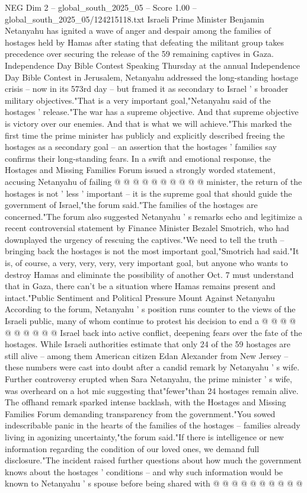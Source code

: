 \begin{textsample}{NEG Dim 2 – global\_south\_2025\_05 – Score 1.00 – global\_south\_2025\_05/124215118.txt}  \label{ex:f2_neg_145}
Israeli Prime Minister Benjamin Netanyahu has ignited a wave of anger and despair among the families of hostages held by Hamas after stating that defeating the militant group takes precedence over securing the release of the 59 remaining captives in Gaza.
Independence Day Bible Contest Speaking Thursday at the annual Independence Day Bible Contest in Jerusalem, Netanyahu addressed the long-standing hostage crisis -- now in its 573rd day -- but framed it as secondary to Israel ' s broader military objectives."That is a very important goal,"Netanyahu said of the hostages ' release."The war has a supreme objective.
And that supreme objective is victory over our enemies.
And that is what we will achieve."This marked the first time the prime minister has publicly and explicitly described freeing the hostages as a secondary goal -- an assertion that the hostages ' families say confirms their long-standing fears.
In a swift and emotional response, the Hostages and Missing Families Forum issued a strongly worded statement, accusing Netanyahu of failing @ @ @ @ @ @ @ @ @ @ minister, the return of the hostages is not ' less ' important -- it is the supreme goal that should guide the government of Israel,"the forum said."The families of the hostages are concerned."The forum also suggested Netanyahu ' s remarks echo and legitimize a recent controversial statement by Finance Minister Bezalel Smotrich, who had downplayed the urgency of rescuing the captives."We need to tell the truth -- bringing back the hostages is not the most important goal,"Smotrich had said."It is, of course, a very, very, very, very important goal, but anyone who wants to destroy Hamas and eliminate the possibility of another Oct. 7 must understand that in Gaza, there can't be a situation where Hamas remains present and intact."Public Sentiment and Political Pressure Mount Against Netanyahu According to the forum, Netanyahu ' s position runs counter to the views of the Israeli public, many of whom continue to protest his decision to end a @ @ @ @ @ @ @ @ @ @ Israel back into active conflict, deepening fears over the fate of the hostages.
While Israeli authorities estimate that only 24 of the 59 hostages are still alive -- among them American citizen Edan Alexander from New Jersey -- these numbers were cast into doubt after a candid remark by Netanyahu ' s wife.
Further controversy erupted when Sara Netanyahu, the prime minister ' s wife, was overheard on a hot mic suggesting that"fewer"than 24 hostages remain alive.
The offhand remark sparked intense backlash, with the Hostages and Missing Families Forum demanding transparency from the government."You sowed indescribable panic in the hearts of the families of the hostages -- families already living in agonizing uncertainty,"the forum said."If there is intelligence or new information regarding the condition of our loved ones, we demand full disclosure."The incident raised further questions about how much the government knows about the hostages ' conditions -- and why such information would be known to Netanyahu ' s spouse before being shared with @ @ @ @ @ @ @ @ @ @

\end{textsample}
